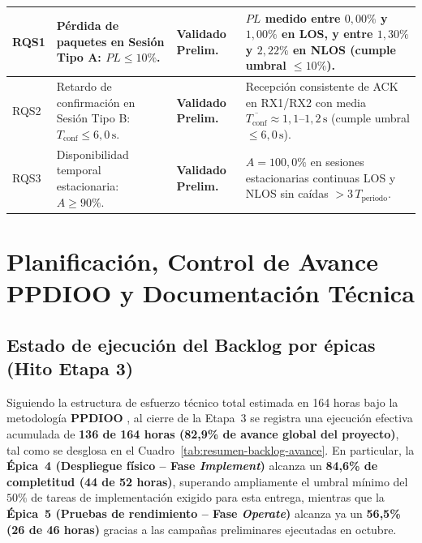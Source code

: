 \documentclass[12pt,oneside,openany,spanish,oldfontcommands]{memoir}
\begin{document}
\begin{table}[!htbp]
\begin{tabularx}{\textwidth}{
    >{\bfseries\raggedright\arraybackslash}p{1.1cm}
    >{\raggedright\arraybackslash}p{2.7cm}
    >{\centering\arraybackslash}p{1.8cm}
    >{\raggedright\arraybackslash}X
}
\midrule
RQS1 & Pérdida de paquetes en Sesión Tipo A: $PL \leq 10\%$. & \textbf{Validado Prelim.} & $PL$ medido entre $0,00\%$ y $1,00\%$ en LOS, y entre $1,30\%$ y $2,22\%$ en NLOS (cumple umbral $\leq 10\%$). \\
\midrule
RQS2 & Retardo de confirmación en Sesión Tipo B: $T_{\mathrm{conf}} \leq 6,0\,\text{s}$. & \textbf{Validado Prelim.} & Recepción consistente de ACK en RX1/RX2 con media $\overline{T_{\mathrm{conf}}} \approx 1,1\text{--}1,2\,\text{s}$ (cumple umbral $\leq 6,0\,\text{s}$). \\
\midrule
RQS3 & Disponibilidad temporal estacionaria: $A \geq 90\%$. & \textbf{Validado Prelim.} & $A = 100,0\%$ en sesiones estacionarias continuas LOS y NLOS sin caídas $> 3\,T_{\mathrm{periodo}}$. \\
\bottomrule
\end{tabularx}
\end{table}

\chapter{Planificación, Control de Avance PPDIOO y Documentación Técnica}\label{cap:planificacion}

\section{Estado de ejecución del Backlog por épicas (Hito Etapa 3)}

Siguiendo la estructura de esfuerzo técnico total estimada en 164 horas bajo la metodología
\textbf{PPDIOO} \parencite{teare_ppdioo}, al cierre de la Etapa~3 se registra una ejecución
efectiva acumulada de \textbf{136 de 164 horas (82,9\% de avance global del proyecto)}, tal como se
desglosa en el Cuadro~\ref{tab:resumen-backlog-avance}. En particular, la \textbf{Épica~4
(Despliegue físico -- Fase \textit{Implement})} alcanza un \textbf{84,6\% de completitud (44 de 52
horas)}, superando ampliamente el umbral mínimo del $50\%$ de tareas de implementación exigido para
esta entrega, mientras que la \textbf{Épica~5 (Pruebas de rendimiento -- Fase \textit{Operate})}
alcanza ya un \textbf{56,5\% (26 de 46 horas)} gracias a las campañas preliminares ejecutadas en
octubre.
\end{document}
